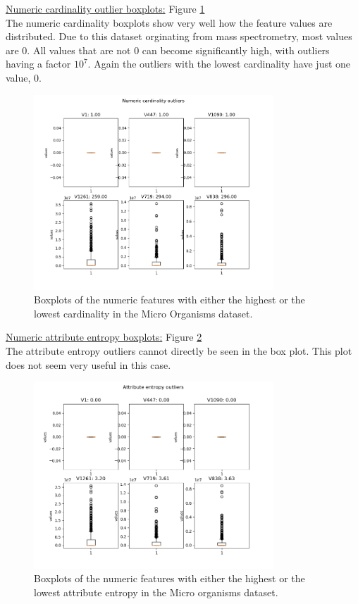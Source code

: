 \documentclass[10pt,a4paper]{article}
\begin{document}
\begin{itemize}
		\underline{Numeric cardinality outlier boxplots:} Figure \ref{fig:MOCardNum} \\
		
		The numeric cardinality boxplots show very well how the feature values are distributed. Due to this dataset orginating from mass spectrometry, most values are 0. All values that are not 0 can become significantly high, with outliers having a factor $10^7$. Again the outliers with the lowest cardinality have just one value, 0.
		
		\begin{figure}[]
			\centering
			\includegraphics[width=0.8\textwidth]{MO_Card_Num.png}
			\caption{Boxplots of the numeric features with either the highest or the lowest cardinality in the Micro Organisms dataset.}
			\label{fig:MOCardNum}
		\end{figure}
		
		\underline{Numeric attribute entropy boxplots:} Figure \ref{fig:MOAttEntNum} \\
		
		The attribute entropy outliers cannot directly be seen in the box plot. This plot does not seem very useful in this case.
		
		\begin{figure}[]
			\centering
			\includegraphics[width=0.8\textwidth]{MO_AttEnt_Num.png}
			\caption{Boxplots of the numeric features with either the highest or the lowest attribute entropy in the Micro organisms dataset.}
			\label{fig:MOAttEntNum}
		\end{figure}
			
	\end{itemize}	
	
\end{document}
